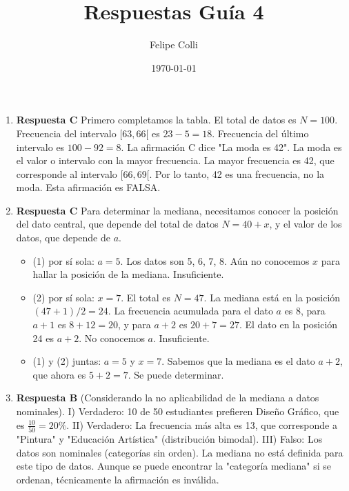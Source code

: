 \documentclass[11pt]{article}
\title{Respuestas Guía 4}
\author{Felipe Colli}
\date{\today}
\begin{document}
\maketitle

\begin{enumerate}
    \section{Respuestas 1-20}

    \item \textbf{Respuesta C} Primero completamos la tabla. El total de datos es $N=100$. Frecuencia del intervalo $[63, 66[$ es $23-5=18$. Frecuencia del último intervalo es $100-92=8$. La afirmación C dice "La moda es 42". La moda es el valor o intervalo con la mayor frecuencia. La mayor frecuencia es 42, que corresponde al intervalo $[66, 69[$. Por lo tanto, 42 es una frecuencia, no la moda. Esta afirmación es FALSA. %

    \item \textbf{Respuesta C} Para determinar la mediana, necesitamos conocer la posición del dato central, que depende del total de datos $N=40+x$, y el valor de los datos, que depende de $a$.
    \begin{itemize}
        \item (1) por sí sola: $a=5$. Los datos son 5, 6, 7, 8. Aún no conocemos $x$ para hallar la posición de la mediana. Insuficiente.
        \item (2) por sí sola: $x=7$. El total es $N=47$. La mediana está en la posición $(47+1)/2=24$. La frecuencia acumulada para el dato $a$ es 8, para $a+1$ es $8+12=20$, y para $a+2$ es $20+7=27$. El dato en la posición 24 es $a+2$. No conocemos $a$. Insuficiente.
        \item (1) y (2) juntas: $a=5$ y $x=7$. Sabemos que la mediana es el dato $a+2$, que ahora es $5+2=7$. Se puede determinar.
    \end{itemize} %

    \item \textbf{Respuesta B} (Considerando la no aplicabilidad de la mediana a datos nominales). I) Verdadero: 10 de 50 estudiantes prefieren Diseño Gráfico, que es $\frac{10}{50}=20\%$. II) Verdadero: La frecuencia más alta es 13, que corresponde a "Pintura" y "Educación Artística" (distribución bimodal). III) Falso: Los datos son nominales (categorías sin orden). La mediana no está definida para este tipo de datos. Aunque se puede encontrar la "categoría mediana" si se ordenan, técnicamente la afirmación es inválida. %
    

\end{enumerate}
\end{document}
